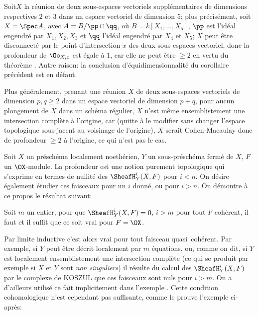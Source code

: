 \begin{exemple} \label{III.3.10}
Soit\pageoriginale $X$ la r\'eunion de deux sous-espaces vectoriels suppl\'ementaires de dimensions respectives $2$ et $3$ dans un espace vectoriel de dimension $5$; plus pr\'ecis\'ement, soit $X=\Spec A$, avec $A=B/{\pp \cap \qq}$, o\`u $B=k[X_1, \ldots, X_5]$, $\pp$ est l'id\'eal engendr\'e par $X_1, X_2, X_3$ et $\qq$ l'id\'eal engendr\'e par $X_4$ et $X_5$; $X$ peut \^etre disconnect\'e par le point d'intersection $x$ des deux sous-espaces vectoriel, donc la profondeur de $\Oo_{X, x}$ est \'egale \`a $1$, car elle ne peut \^etre $\geq 2$ en vertu du th\'eor\`eme . Autre raison: la conclusion d'\'equidimensionnalit\'e du corollaire pr\'ec\'edent est en d\'efaut.

Plus g\'en\'eralement, prenant une r\'eunion $X$ de deux sous-espaces vectoriels de dimension $p, q\geq 2$ dans un espace vectoriel de dimension $p+q$, pour aucun plongement de $X$ dans un sch\'ema r\'egulier, $X$ n'est m\^eme ensemblistement une intersection compl\`ete \`a l'origine, car (quitte \`a le modifier sans changer l'espace topologique sous-jacent au voisinage de l'origine), $X$ serait Cohen-Macaulay donc de profondeur $\geq 2$ \`a l'origine, ce qui n'est pas le cas.
\end{exemple}

\begin{remarque} \label{III.3.11}
Soit $X$ un pr\'esch\'ema localement noeth\'erien, $Y$ un sous-pr\'esch\'ema ferm\'e de $X$, $F$ un $\OX$-module. La profondeur est une notion purement topologique qui s'exprime en termes de nullit\'e des $\SheafH_Y^i(X, F)$ pour $i<n$. On d\'esire \'egalement \'etudier ces faisceaux pour un $i$ donn\'e, ou pour $i>n$. On d\'emontre \`a ce propos le r\'esultat suivant:
\end{remarque}

\begin{lemme} \label{III.3.12}
Soit $m$ un entier, pour que $\SheafH_Y^i(X, F)=0$, $i>m$ pour tout $F$ coh\'erent, il faut et il suffit que ce soit vrai pour $F=\OX$.
\end{lemme}

Par limite inductive c'est alors vrai pour tout faisceau quasi~coh\'erent. Par exemple, si $Y$ peut \^etre d\'ecrit localement par $m$ \'equations, ou, comme on dit, si $Y$ est localement ensemblistement une intersection compl\`ete (ce qui se produit par exemple si $X$ et $Y$ sont \emph{non singuliers}) il r\'esulte du calcul des $\SheafH_Y^i(X, F)$ par le complexe de KOSZUL que ces faisceaux sont nuls pour $i>m$. On a d'ailleurs utilis\'e ce fait implicitement dans l'exemple . Cette condition cohomologique n'est cependant pas suffisante, comme le prouve l'exemple ci-apr\`es:

